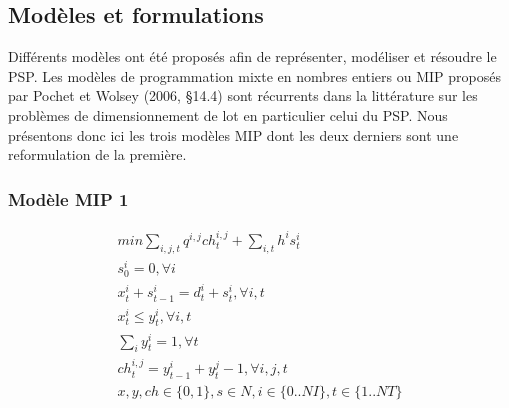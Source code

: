 \documentclass[12pt,a4paper]{article}
\begin{document}
		\subsection{Modèles et formulations}
		Différents modèles ont été proposés afin de représenter, modéliser et résoudre le PSP. Les modèles de programmation mixte en nombres entiers ou MIP proposés par Pochet et Wolsey (2006, §14.4) sont récurrents dans la littérature sur les problèmes de dimensionnement de lot en particulier celui du PSP. Nous présentons donc ici les trois modèles MIP dont les deux derniers sont une reformulation de la première.
		\subsubsection{Modèle MIP 1}
		
		\begin{eqnarray}
			min \sum_{i,j,t} q^{i,j}ch_{t}^{i,j} + \sum_{i,t} h^{i} s_{t}^{i} \\
			s_{0}^{i} = 0, \forall i \\
			x_{t}^{i} + s_{t-1}^{i} = d_{t}^{i} + s_{t}^{i}, \forall i,t \\
			x_{t}^{i} \leq y_{t}^{i}, \forall i,t \\
			\sum_{i} y_{t}^{i} = 1 , \forall t \\
			ch_{t}^{i,j} = y_{t-1}^{i} + y_{t}^{j} - 1, \forall i,j,t \\
			x,y,ch \in \{0,1\}, s \in N, i \in \{0..NI\}, t \in \{1..NT\}
		\end{eqnarray}
		
\end{document}
